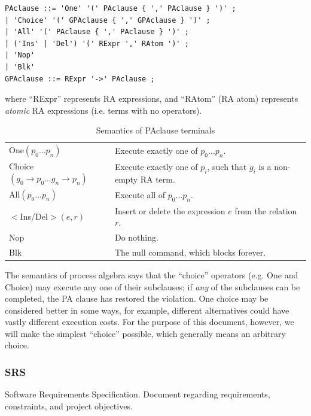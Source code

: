 \documentclass[12pt, svgnames]{article}
\begin{document}
\begin{lstlisting}[basicstyle=\ttfamily]
PAclause ::= 'One' '(' PAclause { ',' PAclause } ')' ; 
| 'Choice' '(' GPAclause { ',' GPAclause } ')' ;  
| 'All' '(' PAclause { ',' PAclause } ')' ;  
| ('Ins' | 'Del') '(' RExpr ',' RAtom ')' ; 
| 'Nop'  
| 'Blk' 
GPAclause ::= RExpr '->' PAclause ; 
\end{lstlisting}
where ``RExpr'' represents RA expressions, and ``RAtom'' (RA atom) represents
\emph{atomic} RA expressions (i.e. terms with no operators).

\begin{table}[ht!]\begin{center}\label{tab:PASemantics}
        \caption{Semantics of PAclause terminals}
        \begin{tabularx}{\textwidth}{lX}
            One$(p_0 \ldots p_n)$ & Execute exactly one of $p_0 \ldots p_n$. \\
            Choice$(g_0 \rightarrow p_0 \ldots g_n \rightarrow p_n)$ & Execute 
            exactly
            one of $p_i$, such that $g_i$ is a non-empty RA term. \\
            All$(p_0 \ldots p_n)$ & Execute all of $p_0 \ldots p_n$. \\
            $<$Ins/Del$>(e,r)$ & Insert or delete the expression $e$ from the 
            relation $r$. \\
            Nop & Do nothing. \\
            Blk & The null command, which blocks forever. 
        \end{tabularx}
    \end{center}\end{table}
    
    The semantics of process algebra says that the ``choice'' operators (e.g. 
    One
    and Choice) may execute any one of their subclauses; if \emph{any} of the
    subclauses can be completed, the PA clause has restored the violation.  One
    choice may be considered better in some ways, for example, different
    alternatives could have vastly different execution costs. For the purpose of
    this document, however, we will make the simplest ``choice'' possible, which
    generally means an arbitrary choice. 

\subsubsection*{SRS}
Software Requirements Specification. Document regarding requirements, 
constraints, and project objectives.
\end{document}
